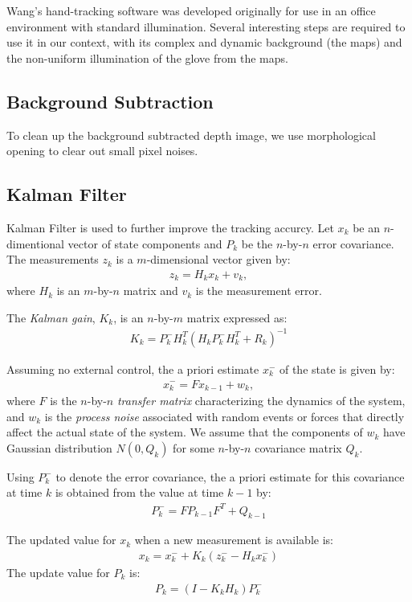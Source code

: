 Wang's hand-tracking software was developed originally for use in an office environment with standard illumination. Several interesting steps are required to use it in our context, with its complex and dynamic background (the maps) and the non-uniform illumination of the glove from the maps. 

\subsection{Background Subtraction}
To clean up the background subtracted depth image, we use morphological opening
to clear out small pixel noises. 

\subsection{Kalman Filter}
Kalman Filter is used to further improve the tracking accurcy.
Let $x_k$ be an $n$-dimentional vector of state components and $P_k$ be the
$n$-by-$n$ error covariance. The measurements $z_k$ is a $m$-dimensional
vector given by:
\begin{align*}
z_k = H_kx_k + v_k,
\end{align*}
where $H_k$ is an $m$-by-$n$ matrix and $v_k$ is the measurement error.

The \textit{Kalman gain}, $K_k$, is an $n$-by-$m$ matrix expressed as:
\begin{align*}
K_k = P_k^-H_k^T(H_kP_k^-H_k^T + R_k)^{-1}
\end{align*}

Assuming no external control, the a priori estimate $x_k^-$ of the state is
given by:
\begin{align*}
x_k^- = Fx_{k - 1} + w_k,
\end{align*}
where $F$ is the $n$-by-$n$ \textit{transfer matrix} characterizing the
dynamics of the system, and $w_k$ is the \textit{process noise} associated with
random events or forces that directly affect the actual state of the system. We assume that the components of $w_k$
have Gaussian distribution $N(0, Q_k)$ for some $n$-by-$n$ covariance matrix
$Q_k$.

Using $P_k^-$ to denote the error covariance, the a priori estimate for this
covariance at time $k$ is obtained from the value at time $k - 1$ by:
\begin{align*}
P_k^- = FP_{k - 1}F^T + Q_{k - 1}
\end{align*}

The updated value for $x_k$ when a new measurement is available is:
\begin{align*}
x_k = x_k^- + K_k(z_k^- - H_kx_k^-)
\end{align*}
The update value for $P_k$ is:
\begin{align*}
P_k = (I - K_kH_k)P_k^-
\end{align*}
   

